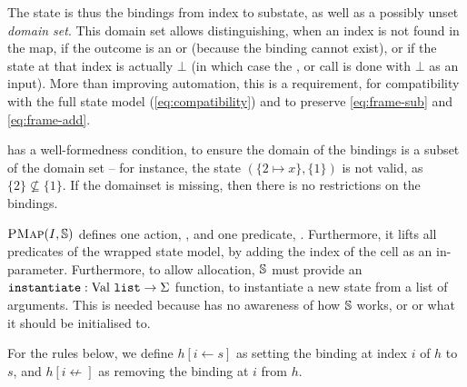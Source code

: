 The state is thus the bindings from index to substate, as well as a possibly unset \emph{domain set}. This domain set allows distinguishing, when an index is not found in the map, if the outcome is an \Err{} or \LFail{} (because the binding cannot exist), or if the state at that index is actually $\bot$ (in which case the \execac, \consume{} or \produce{} call is done with $\bot$ as an input). More than improving automation, this is a requirement, for compatibility with the full state model (\ref{eq:compatibility}) and to preserve \ref{eq:frame-sub} and \ref{eq:frame-add}.

\PMap{} has a well-formedness condition, to ensure the domain of the bindings is a subset of the domain set -- for instance, the state $(\{ 2 \mapsto x \}, \{ 1 \})$ is not valid, as $\{2\} \not\subseteq \{1\}$. If the domainset is missing, then there is no restrictions on the bindings.

$\textsc{PMap}(I,\mathbb S)$ defines one action, \alloc, and one predicate, \domainset. Furthermore, it lifts all predicates of the wrapped state model, by adding the index of the cell as an in-parameter. Furthermore, to allow allocation, $\mathbb S$ must provide an ${\texttt{instantiate}: \text{Val}~\texttt{list} \rightarrow \Sigma}$ function, to instantiate a new state from a list of arguments. This is needed because \PMap{} has no awareness of how $\mathbb S$ works, or or what it should be initialised to. 

For the rules below, we define $h[i \leftarrow s]$ as setting the binding at index $i$ of $h$ to $s$, and $h[i \not\leftarrow]$ as removing the binding at $i$ from $h$.

